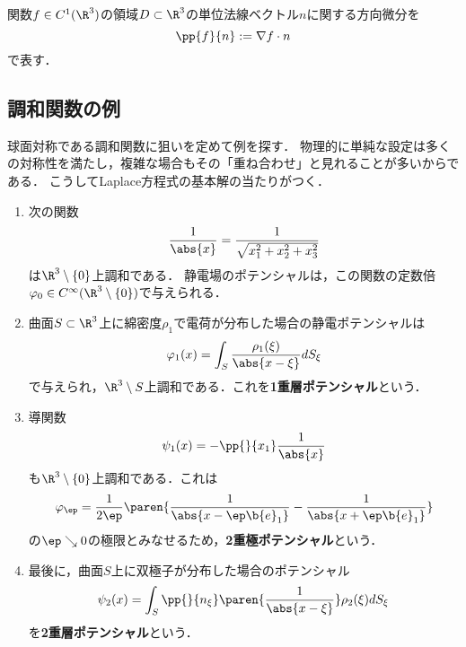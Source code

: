 \documentclass[uplatex,dvipdfmx]{jsreport}
\begin{document}
\begin{definition}[法線微分]
    関数$f\in C^1(\R^3)$の領域$D\subset\R^3$の単位法線ベクトル$n$に関する方向微分を
    \[\pp{f}{n}:=\nabla f\cdot n\]
    で表す．
\end{definition}

\subsection{調和関数の例}

\begin{tcolorbox}[colframe=ForestGreen, colback=ForestGreen!10!white,breakable,colbacktitle=ForestGreen!40!white,coltitle=black,fonttitle=\bfseries\sffamily,
    title=]
    球面対称である調和関数に狙いを定めて例を探す．
    物理的に単純な設定は多くの対称性を満たし，複雑な場合もその「重ね合わせ」と見れることが多いからである．
    こうしてLaplace方程式の基本解の当たりがつく．
\end{tcolorbox}

\begin{example}[静電場のポテンシャル]\mbox{}
    \begin{enumerate}
        \item 次の関数\[\frac{1}{\abs{x}}=\frac{1}{\sqrt{x_1^2+x_2^2+x_3^2}}\]
        は$\R^3\setminus\{0\}$上調和である．
        静電場のポテンシャルは，この関数の定数倍$\varphi_0\in C^\infty(\R^3\setminus\{0\})$で与えられる．
        \item 曲面$S\subset\R^3$上に綿密度$\rho_1$で電荷が分布した場合の静電ポテンシャルは
        \[\varphi_1(x)=\int_S\frac{\rho_1(\xi)}{\abs{x-\xi}}dS_\xi\]
        で与えられ，$\R^3\setminus S$上調和である．これを\textbf{1重層ポテンシャル}という．
        \item 導関数
        \[\psi_1(x)=-\pp{}{x_1}\frac{1}{\abs{x}}\]
        も$\R^3\setminus\{0\}$上調和である．これは
        \[\varphi_\ep=\frac{1}{2\ep}\paren{\frac{1}{\abs{x-\ep\b{e}_1}}-\frac{1}{\abs{x+\ep\b{e}_1}}}\]
        の$\ep\searrow0$の極限とみなせるため，\textbf{2重極ポテンシャル}という．
        \item 最後に，曲面$S$上に双極子が分布した場合のポテンシャル
        \[\psi_2(x)=\int_S\pp{}{n_\xi}\paren{\frac{1}{\abs{x-\xi}}}\rho_2(\xi)dS_\xi\]
        を\textbf{2重層ポテンシャル}という．
    \end{enumerate}
\end{example}
\end{document}
